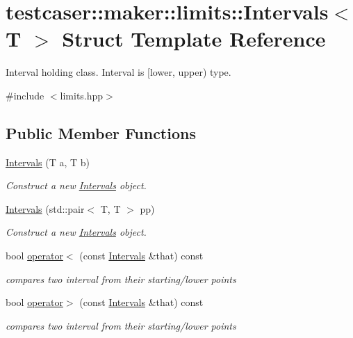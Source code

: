 \hypertarget{structtestcaser_1_1maker_1_1limits_1_1Intervals}{}\section{testcaser\+:\+:maker\+:\+:limits\+:\+:Intervals$<$ T $>$ Struct Template Reference}
\label{structtestcaser_1_1maker_1_1limits_1_1Intervals}


Interval holding class. Interval is \mbox{[}lower, upper) type.  




{\ttfamily \#include $<$limits.\+hpp$>$}

\subsection*{Public Member Functions}
\begin{DoxyCompactItemize}
\item 
\hyperlink{structtestcaser_1_1maker_1_1limits_1_1Intervals_a69fe886908002aa20f41ed886fc213ef}{Intervals} (T a, T b)
\begin{DoxyCompactList}\small\item\em Construct a new \hyperlink{structtestcaser_1_1maker_1_1limits_1_1Intervals}{Intervals} object. \end{DoxyCompactList}\item 
\hyperlink{structtestcaser_1_1maker_1_1limits_1_1Intervals_ad899dc031cbffd5247b9b39e23577a52}{Intervals} (std\+::pair$<$ T, T $>$ pp)
\begin{DoxyCompactList}\small\item\em Construct a new \hyperlink{structtestcaser_1_1maker_1_1limits_1_1Intervals}{Intervals} object. \end{DoxyCompactList}\item 
bool \hyperlink{structtestcaser_1_1maker_1_1limits_1_1Intervals_a68c68c86d5074b2853d0f8582381fc7a}{operator$<$} (const \hyperlink{structtestcaser_1_1maker_1_1limits_1_1Intervals}{Intervals} \&that) const
\begin{DoxyCompactList}\small\item\em compares two interval from their starting/lower points \end{DoxyCompactList}\item 
bool \hyperlink{structtestcaser_1_1maker_1_1limits_1_1Intervals_af5204b4a6f57b16d6719a16554321b4b}{operator$>$} (const \hyperlink{structtestcaser_1_1maker_1_1limits_1_1Intervals}{Intervals} \&that) const
\begin{DoxyCompactList}\small\item\em compares two interval from their starting/lower points \end{DoxyCompactList}\end{DoxyCompactItemize}
